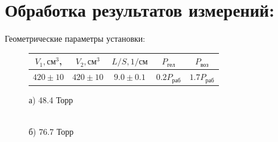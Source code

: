 \documentclass[a4paper, fontsize=12bp]{article}
\begin{document}
\section*{Обработка результатов измерений:}
Геометрические параметры установки:
\\
\begin{figure}[H]
\center
\begin{tabular}{|c|c|c|c|c|}
\hline $V_1, \text{см}^3$, & $V_2, \text{см}^3$ & $L/S, 1/\text{см}$ &
$P_{\text{гел}}$ & $P_{\text{воз}}$ \\
\hline $420 \pm 10$ & $420 \pm 10$ & $9.0 \pm 0.1$ & $0.2 P_{\text{раб}}$
	& $1.7 P_{\text{раб}}$ \\ \hline
	\end{tabular}
\end{figure}
\begin{figure}[H]
\begin{minipage}[h]{0.47\linewidth}
 а) 48.4 Торр \\
\end{minipage}
\hfill
\begin{minipage}[h]{0.47\linewidth}
 \\б) 76.7 Торр

\end{minipage}
\end{figure}
\end{document}
